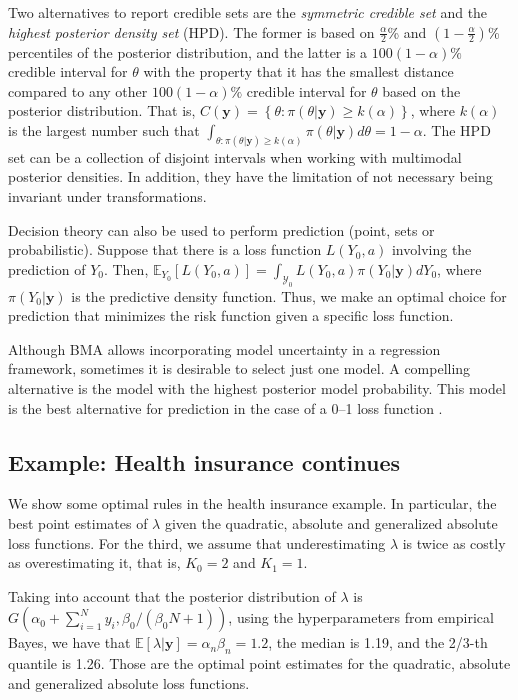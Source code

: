 Two alternatives to report credible sets are the \textit{symmetric credible set} and the \textit{highest posterior density set} (HPD). The former is based on $\frac{\alpha}{2}$\% and $(1-\frac{\alpha}{2})$\% percentiles of the posterior distribution, and the latter is a $100(1-\alpha)\%$ credible interval for $\theta$ with the property that it has the smallest distance compared to any other $100(1-\alpha)\%$ credible interval for $\theta$ based on the posterior distribution. That is, $C(\mathbf{y})=\left\{\theta:\pi(\theta|\mathbf{y})\geq k(\alpha)\right\}$, where $k(\alpha)$ is the largest number such that $\int_{\theta:\pi(\theta|\mathbf{y})\geq k(\alpha)}\pi(\theta|\mathbf{y})d\theta=1-\alpha$. The HPD set can be a collection of disjoint intervals when working with multimodal posterior densities. In addition, they have the limitation of not necessary being invariant under transformations. 

Decision theory can also be used to perform prediction (point, sets or probabilistic). Suppose that there is a loss function $L(Y_0,a)$ involving the prediction of $Y_0$. Then, $\mathbb{E}_{Y_0}[L(Y_0,a)]=\int_{\mathcal{Y}_0}L(Y_0,a)\pi(Y_0|\mathbf{y})dY_0$, where $\pi(Y_0|\mathbf{y})$ is the predictive density function. Thus, we make an optimal choice for prediction that minimizes the risk function given a specific loss function.

Although BMA allows incorporating model uncertainty in a regression framework, sometimes it is desirable to select just one model. A compelling alternative is the model with the highest posterior model probability. This model is the best alternative for prediction in the case of a 0--1 loss function \cite{Clyde2004}.

\subsection{Example: Health insurance continues}\label{131}

We show some optimal rules in the health insurance example. In particular, the best point estimates of $\lambda$ given the quadratic, absolute and generalized absolute loss functions. For the third, we assume that underestimating $\lambda$ is twice as costly as overestimating it, that is, $K_0=2$ and $K_1=1$.

Taking into account that the posterior distribution of $\lambda$ is $G(\alpha_0+\sum_{i=1}^N y_i, \beta_0/(\beta_0N+1))$, using the hyperparameters from empirical Bayes, we have that $\mathbb{E}[\lambda|\mathbf{y}]=\alpha_n\beta_n=1.2$, the median is 1.19, and the 2/3-th quantile is 1.26. Those are the optimal point estimates for the quadratic, absolute and generalized absolute loss functions.

